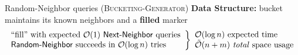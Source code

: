 \begin{block}{\textsf{Random-Neighbor} queries (\textsc{Bucketing-Generator})}
\vspace{15pt}
\colorbox{TealBlue}{\textbf{Data Structure:}} bucket maintains its known neighbors and a \textbf{filled} marker
\vspace{-8pt}
\[
  \begin{array}{l}
  \textrm{``fill'' with expected }\mathcal{O}(1)\textrm{ \textsf{Next-Neighbor} queries}\\
  \textrm{\textsf{Random-Neighbor} succeeds in }\mathcal{O}(\log n)\textrm{ tries}
  \end{array}
  \bigg\}
  \begin{array}{l}
  \mathcal{O}(\log n)\textrm{ expected time}\\
  \tilde{\mathcal{O}}(n+m)\textrm{ \emph{total} space usage}
  \end{array}
\]



\end{block}
\vspace{-0.5in}


